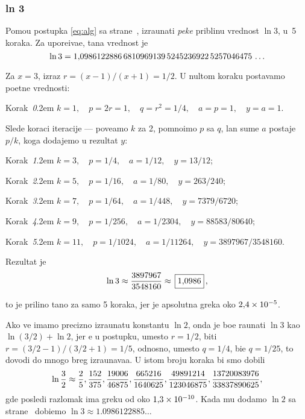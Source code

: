 \subsubsection{ln 3}\label{sssec:ln3}
 
\zadatak
Pomo{\cc}u postupka \eqref{eq:alg} sa 
strane~\pageref{eq:alg},
izra{\cv}unati {\sl pe{\sv}ke\/} pribli{\zv}nu vrednost $\ln 3$, 
u~5 koraka. Za upore{\dj}iva{\nj}e, ta{\cv}na vrednost je
$$
\ln3=1\.
0986122886\,
6810969139\,
5245236922\,
5257046475\,\ldots
$$

\def\step#1{\par\smallskip\indent\leavevmode
  Korak~{\it#1}.\kern2em\relax}

\resenje
Za $x=3$, izraz $r=(x-1)/(x+1)=1/2$. U nultom koraku postav{\lj}amo po{\cv}etne vrednosti:
\step0 $k=1,\quad p=2r=1,\quad q=r^2=1/4,\quad a=p=1,\quad y=a=1$.

\smallskip
\noindent Slede koraci iteracije --- pove{\cc}amo $k$ za 2, pomno{\zv}imo $p$ sa $q$,
{\cv}lan sume $a$ postaje $p/k$, koga dodajemo u rezultat $y$:

\step1 $k=3,\quad p=1/4,\quad a=1/12,\quad y=13/12$;
\step2 $k=5,\quad p=1/16,\quad a=1/80,\quad y=263/240$;
\step3 $k=7,\quad p=1/64,\quad a=1/448,\quad y=7379/6720$;
\step4 $k=9,\quad p=1/256,\quad a=1/2304,\quad y=88583/80640$;
\step5 $k=11,\quad p=1/1024,\quad a=1/11264,\quad y=3897967/3548160$.

\medskip
\noindent Rezultat je
$$
\ln3\approx{3897967\over3548160}\approx \ram{1\.0986},
$$

\smallskip\noindent
{\sv}to je prili{\cv}no ta{\cv}no za samo 5 koraka, jer je apsolutna gre{\sv}ka oko $2\.4\puta10^{-5}$.

\iffalse
Da smo ra{\cv}unali u 20 koraka, 
dobili bi smo $\ln3\approx\frac{636083906982236368109838473}{578988523561291667944243200}$, 
gre{\sv}ka bi bila oko $7\puta10^{-15}$, {\sv}to je preciznost s kojom je 1617.\ godine Brigs
izra{\cv}unao svoje prve logaritamske tablice.
\fi

\dodatak
Ako ve{\cc} imamo precizno izra{\cv}unatu konstantu $\ln2$, onda je bo{\lj}e ra{\cv}unati $\ln3$ kao $\ln(3/2)+\ln2$,
jer {\cc}e u postupku, umesto $r=1/2$, biti $r=(3/2-1)/(3/2+1)=1/5$, 
odnosno, umesto $q=1/4$, bi{\cc}e $q=1/25$,
{\sv}to dovodi do mnogo br{\zv}eg izra{\cv}unava{\nj}a. U istom broju koraka bi smo dobili
$$
\ln\frac32\approx
\ff2/5, \ff152/375, \ff19006/46875, \ff665216/1640625, \ff49891214/123046875, 
\ff13720083976/33837890625,
$$
gde posled{\nj}i razlomak ima gre{\sv}ku od oko $1\.3\puta10^{-10}$.
Kada mu dodamo $\ln2$ sa strane~\pageref{ln2} dobi{\cc}emo
$
\ln3\approx1.0986122885\ldots
$
\iffalse
Ovakav postupak je najbr{\zv}i ako ra{\cv}unamo $\ln x=\ln(x/2^n)+n\ln2$,
gde biramo $n$ takvo da $|x/2^n|$ bude {\sv}to bil{\zv}e 1, odnosno, da $|q|$ bude najma{\nj}e mogu{\cc}e.
Na primer, za $\ln5$ treba izabrati $n=2$, odnosno, $\ln5=\ln(5/2^2)+2\ln2$, dok je
$\ln7=\ln(7/2^3)+3\ln2$.
\fi